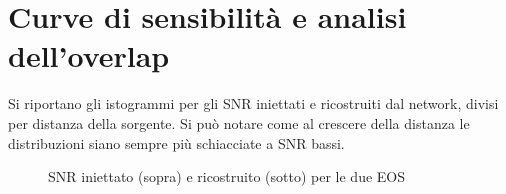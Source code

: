 \section{Curve di sensibilità e analisi dell'overlap}
\label{section:overlap}
Si riportano gli istogrammi per gli SNR iniettati e ricostruiti dal network, divisi per distanza della sorgente. Si può notare come al crescere della distanza le distribuzioni siano sempre più schiacciate a SNR bassi.
\begin{figure}[H]
	\vspace{-20pt}
	\centering
	\vspace{-5pt}
	\caption{SNR iniettato (sopra) e ricostruito (sotto) per le due EOS}
	\label{fig:SNR_INJ_REC_COUNTS}
	\vspace{-15pt}
\end{figure}
